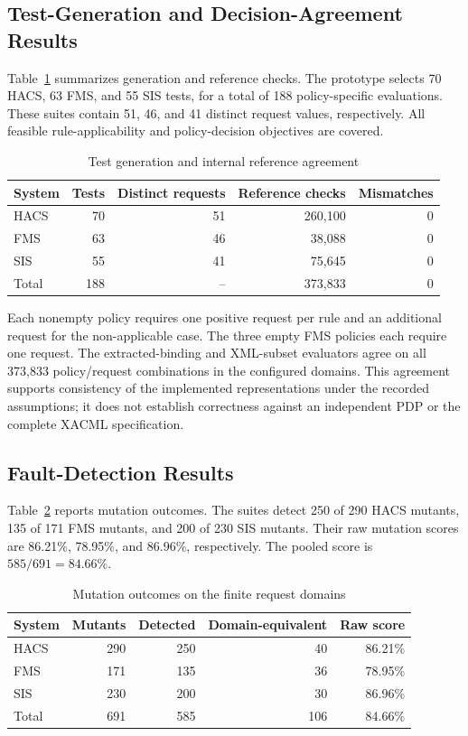 \subsection{Test-Generation and Decision-Agreement Results}
\label{subsec:exp_generation_results}

Table~\ref{tab:exp_tests} summarizes generation and reference checks.
The prototype selects 70 HACS, 63 FMS, and 55 SIS tests, for a total
of 188 policy-specific evaluations. These suites contain 51, 46,
and 41 distinct request values, respectively. All feasible
rule-applicability and policy-decision objectives are covered.

\begin{table}[htbp]
\centering
\caption{Test generation and internal reference agreement}
\label{tab:exp_tests}
\small
\begin{tabular}{lrrrr}
\hline
System & Tests & Distinct requests & Reference checks & Mismatches \\
\hline
HACS & 70 & 51 & 260,100 & 0 \\
FMS & 63 & 46 & 38,088 & 0 \\
SIS & 55 & 41 & 75,645 & 0 \\
\hline
Total & 188 & -- & 373,833 & 0 \\
\hline
\end{tabular}
\end{table}

Each nonempty policy requires one positive request per rule and an
additional request for the non-applicable case. The three empty FMS
policies each require one request. The extracted-binding and XML-subset
evaluators agree on all 373,833 policy/request combinations in the
configured domains. This agreement supports consistency of the
implemented representations under the recorded assumptions; it does
not establish correctness against an independent PDP or the complete
XACML specification.

\subsection{Fault-Detection Results}
\label{subsec:exp_fault_detection}

Table~\ref{tab:exp_mutants} reports mutation outcomes. The suites
detect 250 of 290 HACS mutants, 135 of 171 FMS mutants, and 200 of
230 SIS mutants. Their raw mutation scores are 86.21\%, 78.95\%,
and 86.96\%, respectively. The pooled score is $585/691=84.66\%$.

\begin{table}[htbp]
\centering
\caption{Mutation outcomes on the finite request domains}
\label{tab:exp_mutants}
\small
\begin{tabular}{lrrrr}
\hline
System & Mutants & Detected & Domain-equivalent & Raw score \\
\hline
HACS & 290 & 250 & 40 & 86.21\% \\
FMS & 171 & 135 & 36 & 78.95\% \\
SIS & 230 & 200 & 30 & 86.96\% \\
\hline
Total & 691 & 585 & 106 & 84.66\% \\
\hline
\end{tabular}
\end{table}

